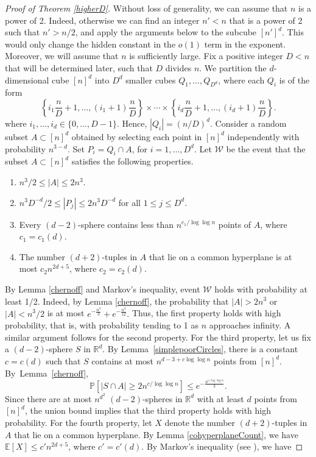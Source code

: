 \documentclass[11pt]{article}
\theoremstyle{plain}
\theoremstyle{definition}
\theoremstyle{remark}
\begin{document}
\begin{proof}[Proof of Theorem \ref{higherD}]
    Without loss of generality, we can assume that $n$ is a power of 2.  Indeed, otherwise we can find an integer $n' < n$ that is a power of 2 such that $n' > n/2$, and apply the arguments below to the subcube $[n']^d$.  This would only change the hidden constant in the $o(1)$ term in the exponent.  Moreover, we will assume that $n$ is sufficiently large.
%
Fix a positive integer $D < n$ that will be determined later, such that $D$ divides $n$. We partition the $d$-dimensional cube $[n]^d$ into $D^d$ smaller cubes $Q_1,\ldots, Q_{D^d}$, where each $Q_i$ is of the form
%
%
    $$\left\{i_1 \frac{n}{D}  + 1,\ldots, (i_1 + 1) \frac{n}{D} \right\}\times \cdots \times \left\{i_d\frac{n}{D} + 1,\ldots, (i_d + 1) \frac{n}{D} \right\}.$$
%
\noindent where $i_1,\ldots, i_d \in \{0,\ldots, D-1\}$. Hence, $|Q_i| = (n/D)^d$. 
%
%
%
%
Consider a random subset $A\subset [n]^d$ obtained by selecting each point in $[n]^d$ independently with probability $n^{3-d}$.   Set $P_i = Q_i\cap A$, for $i = 1,\ldots, D^d$. Let $\mathcal{W}$ be the event that the subset $A\subset [n]^d$ satisfies the following properties. 
%
%
\begin{enumerate}
    \item $n^3/2 \leq |A| \leq 2n^3$.
    \item $n^3D^{-d}/2 \leq |P_j| \leq 2n^3D^{-d}$ for all $1 \leq j \leq D^d$.
    \item Every $(d-2)$-sphere contains less than $n^{c_1/\log\log n}$ points of $A$, where $c_1 = c_1(d)$.
    \item The number $(d+2)$-tuples in $A$ that lie on a common hyperplane is at most $c_2n^{2d+5}$, where $c_2 = c_2(d)$.
\end{enumerate}
%
By Lemma \ref{chernoff} and Markov's inequality, event $\mathcal{W}$ holds with probability at least 1/2.   Indeed, by Lemma \ref{chernoff}, the probability that $|A| > 2n^3$ or $|A| < n^3/2$ is at most $e^{-\frac{n^3}{3}} + e^{-\frac{n^3}{12}}.$ Thus, the first property holds with high probability, that is, with probability tending to 1 as $n$ approaches infinity.  A similar argument follows for the second property.  For the third property, let us fix a $(d-2)$-sphere $S$ in $\mathbb{R}^d$.  By Lemma~\ref{simplepoorCircles}, there is a constant $c= c(d)$ such that $S$ contains at most $n^{d-3 + c\log\log n}$ points from $[n]^d$.  By~Lemma~\ref{chernoff}, 
%
$$\mathbb{P}[|S\cap A| \geq 2n^{c/\log\log n}] \leq  e^{-\frac{n^{c/\log\log n}}{3}}.$$
%
\noindent   Since there are at most $n^{d^2}$ $(d-2)$-spheres in $\mathbb{R}^d$ with at least $d$ points from $[n]^d$, the union bound implies that the third property holds with high probability.  For the fourth property, let $X$ denote the number $(d+2)$-tuples in $A$ that lie on a common hyperplane.  By Lemma \ref{cohyperplaneCount}, we have $\mathbb{E}[X] \leq c'n^{2d + 5}$, where $c' = c'(d)$. By Markov's inequality (see \cite{alon}), we have

\end{proof}
\end{document}
